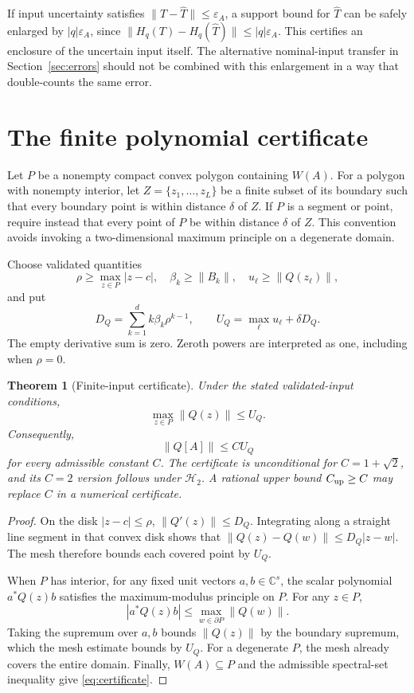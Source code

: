 \documentclass[11pt]{article}
\newcommand{\C}{\mathbb C}
\newcommand{\norm}[1]{\lVert #1\rVert}
\newcommand{\W}{W}
\newcommand{\cbase}{1+\sqrt{2}}
\newcommand{\HH}{\mathcal H}
\newtheorem{theorem}{Theorem}[section]
\theoremstyle{definition}
\theoremstyle{remark}
\numberwithin{equation}{section}
\begin{document}
If input uncertainty satisfies \(\norm{T-\widehat T}\le\varepsilon_A\),
a support bound for \(\widehat T\) can be safely enlarged by
\(|q|\varepsilon_A\), since
\(\norm{H_q(T)-H_q(\widehat T)}\le|q|\varepsilon_A\).
This certifies an enclosure of the uncertain input itself. The alternative
nominal-input transfer in Section~\ref{sec:errors} should not be combined
with this enlargement in a way that double-counts the same error.

\section{The finite polynomial certificate}\label{sec:certificate}
Let \(P\) be a nonempty compact convex polygon containing \(\W(A)\).
For a polygon with nonempty interior, let \(Z=\{z_1,\ldots,z_L\}\)
be a finite subset of its boundary such that every boundary point is
within distance \(\delta\) of \(Z\).
If \(P\) is a segment or point, require instead that every point of \(P\)
be within distance \(\delta\) of \(Z\).
This convention avoids invoking a two-dimensional maximum principle on a
degenerate domain.

Choose validated quantities
\[
 \rho\ge\max_{z\in P}|z-c|,\quad
 \beta_k\ge\norm{B_k},\quad
 u_\ell\ge\norm{Q(z_\ell)},
\]
and put
\begin{equation}\label{eq:DandU}
 D_Q=\sum_{k=1}^{d} k\beta_k\rho^{k-1},
 \qquad U_Q=\max_{\ell}u_\ell+\delta D_Q.
\end{equation}
The empty derivative sum is zero. Zeroth powers are interpreted as one,
including when \(\rho=0\).

\begin{theorem}[Finite-input certificate]\label{thm:finite}
Under the stated validated-input conditions,
\[
 \max_{z\in P}\norm{Q(z)}\le U_Q.
\]
Consequently,
\begin{equation}\label{eq:certificate}
 \norm{Q[A]}\le C U_Q
\end{equation}
for every admissible constant \(C\).
The certificate is unconditional for \(C=\cbase\), and its \(C=2\)
version follows under \(\HH_2\).
A rational upper bound \(C_{\rm up}\ge C\) may replace \(C\)
in a numerical certificate.
\end{theorem}
\begin{proof}
On the disk \(|z-c|\le\rho\),
\(\norm{Q'(z)}\le D_Q\).
Integrating along a straight line segment in that convex disk shows that
\(\norm{Q(z)-Q(w)}\le D_Q|z-w|\).
The mesh therefore bounds each covered point by \(U_Q\).

When \(P\) has interior, for any fixed unit vectors \(a,b\in\C^s\),
the scalar polynomial \(a^*Q(z)b\) satisfies the maximum-modulus
principle on \(P\).
For any \(z\in P\),
\[
 |a^*Q(z)b|\le\max_{w\in\partial P}\norm{Q(w)}.
\]
Taking the supremum over \(a,b\) bounds \(\norm{Q(z)}\) by the boundary
supremum, which the mesh estimate bounds by \(U_Q\).
For a degenerate \(P\), the mesh already covers the entire domain.
Finally, \(\W(A)\subseteq P\) and the admissible spectral-set inequality
give \eqref{eq:certificate}.
\end{proof}
\end{document}
